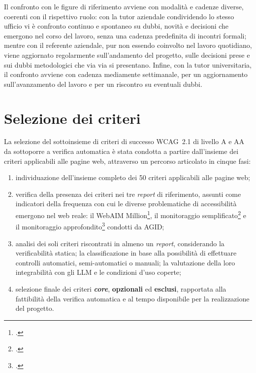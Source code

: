 Il confronto con le figure di riferimento avviene con modalità e cadenze diverse, coerenti con il rispettivo ruolo: con la tutor aziendale condividendo lo stesso ufficio vi è confronto continuo e spontaneo su dubbi, novità e decisioni che emergono nel corso del lavoro, senza una cadenza predefinita di incontri formali; mentre con il referente aziendale, pur non essendo coinvolto nel lavoro quotidiano, viene aggiornato regolarmente sull'andamento del progetto, sulle decisioni prese e sui dubbi metodologici che via via si presentano. Infine, con la tutor universitaria, il confronto avviene con cadenza mediamente settimanale, per un aggiornamento sull'avanzamento del lavoro e per un riscontro su eventuali dubbi.

\section{Selezione dei criteri}
\label{sec:selezione-criteri}

La selezione del sottoinsieme di criteri di successo WCAG~2.1 di livello A e AA da sottoporre a verifica automatica è stata condotta a partire dall'insieme dei criteri applicabili alle pagine web, attraverso un percorso articolato in cinque fasi:

\begin{enumerate}

\item individuazione dell'insieme completo dei 50 criteri applicabili alle pagine web;

\item verifica della presenza dei criteri nei tre \emph{report} di riferimento, assunti come indicatori della frequenza con cui le diverse problematiche di accessibilità emergono nel web reale: il WebAIM Million\footcite{webaim:million2026}, il monitoraggio semplificato\footcite{agid:errori-semplificato} e il monitoraggio approfondito\footcite{agid:errori-approfondito} condotti da AGID;

\item analisi dei soli criteri riscontrati in almeno un \emph{report}, considerando la verificabilità statica; la classificazione in base alla possibilità di effettuare controlli automatici, semi-automatici o manuali; la valutazione della loro integrabilità con gli LLM e le condizioni d'uso coperte;

\item selezione finale dei criteri \textbf{\emph{core}}, \textbf{opzionali} ed \textbf{esclusi}, rapportata alla fattibilità della verifica automatica e al tempo disponibile per la realizzazione del progetto.
\end{enumerate}

